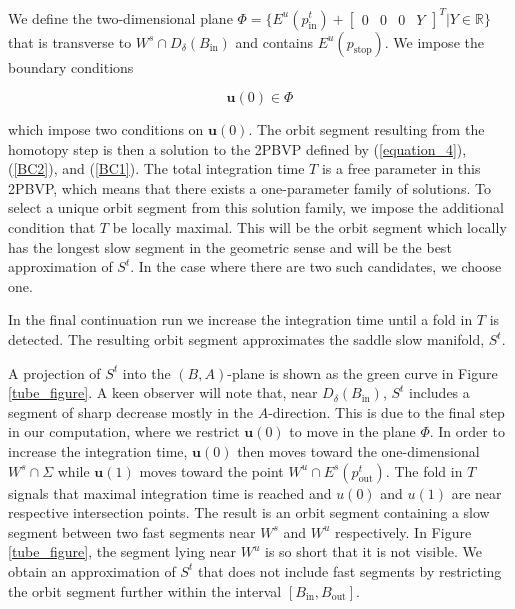 \documentclass{ws-ijbc}
\begin{document}
We define the two-dimensional plane $\Phi = \{E^u(p^t_{\mathrm{in}}) + \begin{bmatrix} 0 & 0 & 0 & Y \end{bmatrix}^{T}| Y \in \mathbb{R} \}$ that is transverse to $W^s \cap D_{\delta}(B_{\mathrm{in}})$ and contains $E^u(p_{\text{stop}})$.  We impose the boundary conditions
    
\begin{equation}
\mathbf{u}(0) \in \Phi
\label{BC1}
\end{equation}
    
\noindent
which impose two conditions on $\mathbf{u}(0)$.  The orbit segment resulting from the homotopy step is then a solution to the 2PBVP defined by (\ref{equation_4}), (\ref{BC2}), and (\ref{BC1}).  The total integration time $T$ is a free parameter in this 2PBVP, which means that there exists a one-parameter family of solutions.  To select a unique orbit segment from this solution family, we impose the additional condition that $T$ be locally maximal.  This will be the orbit segment which locally has the longest slow segment in the geometric sense and will be the best approximation of $S^t$.  In the case where there are two such candidates, we choose one.
    
In the final continuation run we increase the integration time until a fold in $T$ is detected.  The resulting orbit segment approximates the saddle slow manifold, $S^t$.
   
A projection of $S^t$ into the $(B,A)$-plane is shown as the green curve in Figure \ref{tube_figure}.  A keen observer will note that, near $D_\delta(B_{\mathrm{in}})$, $S^t$ includes a segment of sharp decrease mostly in the $A$-direction.  This is due to the final step in our computation, where we restrict $\mathbf{u}(0)$ to move in the plane $\Phi$.  In order to increase the integration time, $\mathbf{u}(0)$ then moves toward the one-dimensional $W^s \cap \Sigma$ while $\mathbf{u}(1)$ moves toward the point $W^u \cap E^s(p^t_{\mathrm{out}})$.  The fold in $T$ signals that maximal integration time is reached and $u(0)$ and $u(1)$ are near respective intersection points. The result is an orbit segment containing a slow segment between two fast segments near $W^s$ and $W^u$ respectively.  In Figure \ref{tube_figure}, the segment lying near $W^u$ is so short that it is not visible.  We obtain an approximation of $S^t$ that does not include fast segments by restricting the orbit segment further within the interval $[B_{\mathrm{in}},B_{\mathrm{out}}]$.
   
\end{document}
